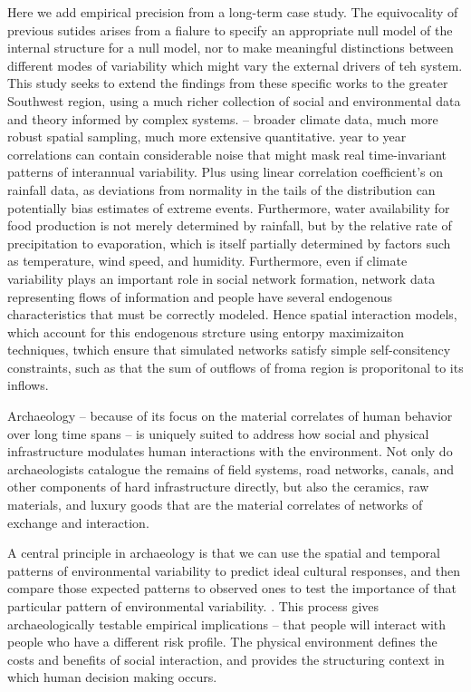 \documentclass[fleqn,10pt]{wlscirep}
\begin{document}
Here we add empirical precision from a long-term case study. The equivocality of previous sutides arises from a fialure to specify an appropriate null model of the internal structure for a null model, nor to make meaningful distinctions between different modes of variability which might vary the external drivers of teh system. This study seeks to extend the findings from these specific works to the greater Southwest region, using a much richer collection of social and environmental data and theory informed by complex systems. -- broader climate data, much more robust spatial sampling, much more extensive quantitative. year to year correlations can contain considerable noise that might mask real time-invariant patterns of interannual variability. Plus using linear correlation coefficient's on rainfall data, as deviations from normality in the tails of the distribution can potentially bias estimates of extreme events. Furthermore, water availability for food production is not merely determined by rainfall, but by the relative rate of precipitation to evaporation, which is itself partially determined by factors such as temperature, wind speed, and humidity. Furthermore, even if climate variability plays an important role in social network formation, network data representing flows of information and people have several endogenous characteristics that must be correctly modeled. Hence spatial interaction models, which account for this endogenous strcture using entorpy maximizaiton techniques, twhich ensure that simulated networks satisfy simple self-consitency constraints, such as that the sum of outflows of froma region is proporitonal to its inflows.


Archaeology -- because of its focus on the material correlates of human behavior over long time spans -- is uniquely suited to address how social and physical infrastructure modulates human interactions with the environment. Not only do archaeologists catalogue the remains of field systems, road networks, canals, and other components of hard infrastructure directly, but also the ceramics, raw materials, and luxury goods that are the material correlates of networks of exchange and interaction. 




A central principle in archaeology is that we can use the spatial and temporal patterns of environmental variability to predict ideal cultural responses, and then compare those expected patterns to observed ones to test the importance of that particular pattern of environmental variability. \cite{halstead1989}. This process gives archaeologically testable empirical implications -- that people will interact with people who have a different risk profile. The physical environment defines the costs and benefits of social interaction, and provides the structuring context in which human decision making occurs.
\end{document}
